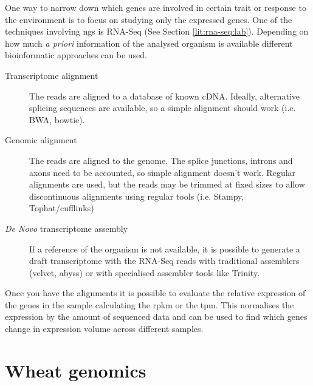 One way to narrow down which genes are involved in certain trait or response to the environment is to focus on studying only the expressed genes. One of the techniques involving \gls{ngs} is RNA-Seq (See Section \ref{lit:rna-seq:lab}). %
Depending on how much \textit{a priori} information of the analysed organism is available different bioinformatic approaches can be used.
\begin{description}
\item[Transcriptome alignment] The reads are aligned to a database of known cDNA. Ideally, alternative splicing sequences are available, so a simple alignment should work (i.e. BWA, bowtie). 
\item[Genomic alignment] The reads are aligned to the genome. The splice junctions, introns and axons need to be accounted, so simple alignment doesn't work. Regular alignments are used, but the reads may be trimmed at fixed sizes to allow discontinuous alignments using regular tools (i.e. Stampy, Tophat/cufflinks)
\item[\textit{De Novo} transcriptome assembly] If a reference of the organism is not available, it is possible to generate a draft transcriptome with the RNA-Seq reads with traditional assemblers (velvet, abyss) or with specialised assembler tools like Trinity. 
\end{description}

Once you have the alignments it is possible to evaluate the relative expression of the genes in the sample calculating the \gls{rpkm} or the \gls{tpm}. This normalises the expression by the amount of sequenced data and can be used to find which genes change in expression volume across different samples.   


\section{Wheat genomics}
\label{lit:wheatResourcers}

